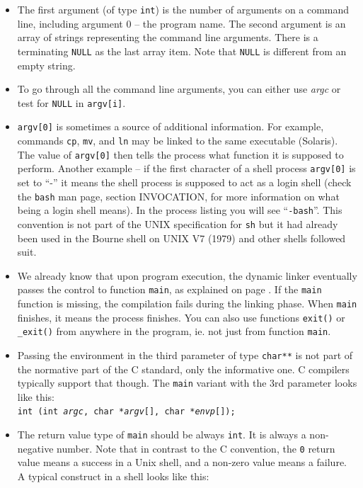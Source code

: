 \begin{itemize}
\item The first argument (of type \texttt{int}) is the number of arguments on a
command line, including argument 0 -- the program name.  The second argument is
an array of strings representing the command line arguments.  There is a
terminating \texttt{NULL} as the last array item.  Note that \texttt{NULL} is
different from an empty string.
\item To go through all the command line arguments, you can either use
\emph{argc} or test for \texttt{NULL} in \texttt{argv[i]}.
\item \label{SHELL_ARGV0} \texttt{argv[0]} is sometimes a source of additional
information.  For example, commands \texttt{cp}, \texttt{mv}, and \texttt{ln} may
be linked to the same executable (Solaris).  The value of \texttt{argv[0]} then
tells the process what function it is supposed to perform.  Another example -- if
the first character of a shell process \texttt{argv[0]} is set to ``-'' it means
the shell process is supposed to act as a login shell (check the \texttt{bash}
man page, section INVOCATION, for more information on what being a login shell
means).  In the process listing you will see ``\texttt{-bash}''.  This
convention is not part of the UNIX specification for \texttt{sh} but it had already
been used in the Bourne shell on UNIX V7 (1979) and other shells followed suit.
\item We already know that upon program execution, the dynamic linker
eventually passes the control to function \texttt{main}, as explained on page
\pageref{RUNTIMELINKER}.  If the \texttt{main} function is missing, the
compilation fails during the linking phase.  When \texttt{main} finishes, it
means the process finishes.  You can also use functions \texttt{exit()} or
\verb#_exit()# from anywhere in the program, ie. not just from function
\texttt{main}.
\item Passing the environment in the third parameter of type
\texttt{char**} is not part of the normative part of the C standard, only the
informative one.  C compilers typically support that though.
The \texttt{main} variant with the 3rd parameter looks like this:\\ \texttt{int
(int \emph{argc}, char *\emph{argv}[], char *\emph{envp}[]);}
\item The return value type of \texttt{main} should be always \texttt{int}.
  It is always a
non-negative number.  Note that in contrast to the C convention, the \texttt{0}
return value means a success in a Unix shell, and a non-zero value means a
failure.  A typical construct in a shell looks like this:


\end{itemize}
